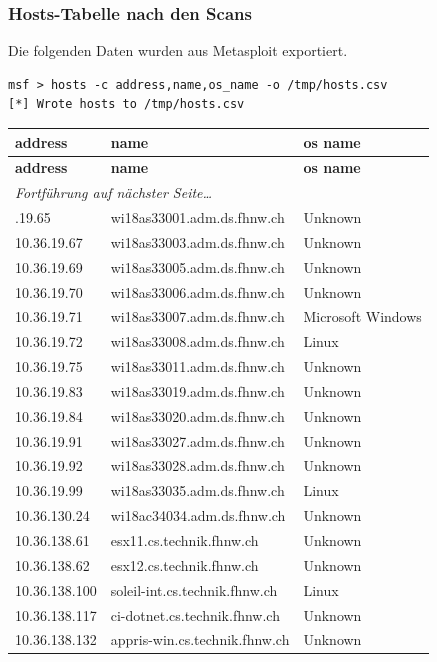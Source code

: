 \documentclass[11pt,a4paper]{scrartcl}
\begin{document}
\subsubsection{Hosts-Tabelle nach den Scans}
Die folgenden Daten wurden aus Metasploit exportiert.
\begin{lstlisting}
msf > hosts -c address,name,os_name -o /tmp/hosts.csv
[*] Wrote hosts to /tmp/hosts.csv
\end{lstlisting}
\begin{longtable}{p{2.5cm}|p{8cm}|l}
	\textbf{address} & \textbf{name} & \textbf{os name}\\
	\hline
	\endfirsthead
	\textbf{address} & \textbf{name} & \textbf{os name}\\
	\hline
	\endhead
	\hline
	\multicolumn{2}{l}{\textit{Fortführung auf nächster Seite\ldots}} \\
	\endfoot
	\endlastfoot
	10.36.19.65 & wi18as33001.adm.ds.fhnw.ch & Unknown\\
	10.36.19.67 & wi18as33003.adm.ds.fhnw.ch & Unknown\\
	10.36.19.69 & wi18as33005.adm.ds.fhnw.ch & Unknown\\
	10.36.19.70 & wi18as33006.adm.ds.fhnw.ch & Unknown\\
	10.36.19.71 & wi18as33007.adm.ds.fhnw.ch & Microsoft Windows\\
	10.36.19.72 & wi18as33008.adm.ds.fhnw.ch & Linux\\
	10.36.19.75 & wi18as33011.adm.ds.fhnw.ch & Unknown\\
	10.36.19.83 & wi18as33019.adm.ds.fhnw.ch & Unknown\\
	10.36.19.84 & wi18as33020.adm.ds.fhnw.ch & Unknown\\
	10.36.19.91 & wi18as33027.adm.ds.fhnw.ch & Unknown\\
	10.36.19.92 & wi18as33028.adm.ds.fhnw.ch & Unknown\\
	10.36.19.99 & wi18as33035.adm.ds.fhnw.ch & Linux\\
	10.36.130.24 & wi18ac34034.adm.ds.fhnw.ch & Unknown\\
	10.36.138.61 & esx11.cs.technik.fhnw.ch & Unknown\\
	10.36.138.62 & esx12.cs.technik.fhnw.ch & Unknown\\
	10.36.138.100 & soleil-int.cs.technik.fhnw.ch & Linux\\
	10.36.138.117 & ci-dotnet.cs.technik.fhnw.ch & Unknown\\
	10.36.138.132 & appris-win.cs.technik.fhnw.ch & Unknown\\

\end{longtable}
\end{document}
